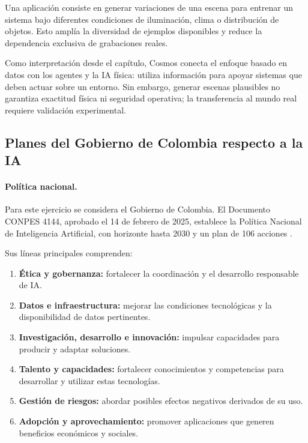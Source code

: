 \documentclass[14pt,twoside]{article}
\begin{document}
Una aplicación consiste en generar variaciones de una escena
para entrenar un sistema bajo diferentes condiciones de
iluminación, clima o distribución de objetos. Esto amplía la
diversidad de ejemplos disponibles y reduce la dependencia
exclusiva de grabaciones reales.

Como interpretación desde el capítulo, Cosmos conecta el enfoque
basado en datos con los agentes y la IA física: utiliza información
para apoyar sistemas que deben actuar sobre un entorno. Sin
embargo, generar escenas plausibles no garantiza exactitud física
ni seguridad operativa; la transferencia al mundo real requiere
validación experimental.


\subsection{Planes del Gobierno de Colombia respecto a la IA}

\paragraph{Política nacional.}

Para este ejercicio se considera el Gobierno de Colombia. El
Documento CONPES 4144, aprobado el 14 de febrero de 2025, establece
la Política Nacional de Inteligencia Artificial, con horizonte
hasta 2030 y un plan de 106 acciones \cite{conpes4144}.

Sus líneas principales comprenden:

\begin{enumerate}
    \item \textbf{Ética y gobernanza:}
    fortalecer la coordinación y el desarrollo responsable de IA.

    \item \textbf{Datos e infraestructura:}
    mejorar las condiciones tecnológicas y la disponibilidad
    de datos pertinentes.

    \item \textbf{Investigación, desarrollo e innovación:}
    impulsar capacidades para producir y adaptar soluciones.

    \item \textbf{Talento y capacidades:}
    fortalecer conocimientos y competencias para desarrollar
    y utilizar estas tecnologías.

    \item \textbf{Gestión de riesgos:}
    abordar posibles efectos negativos derivados de su uso.

    \item \textbf{Adopción y aprovechamiento:}
    promover aplicaciones que generen beneficios económicos
    y sociales.
\end{enumerate}
\end{document}

